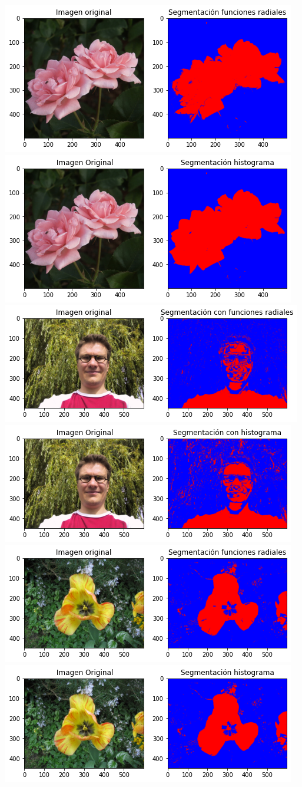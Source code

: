 \documentclass[11pt,letterpaper]{article}
\theoremstyle{definition}
\theoremstyle{definition}
\theoremstyle{definition}
\begin{document}
\begin{center}
	\includegraphics[width=0.7\linewidth]{graficas/rose_seg}
	\\
	\includegraphics[width=0.7\linewidth]{graficas/rose_hist}
	\\
	\includegraphics[width=0.7\linewidth]{graficas/person_seg}
	\\
	\includegraphics[width=0.7\linewidth]{graficas/person_hist}
	\\
	\includegraphics[width=0.7\linewidth]{graficas/flower_seg}
	\\
	\includegraphics[width=0.7\linewidth]{graficas/flower_hist}
\end{center}
\end{document}
